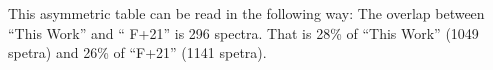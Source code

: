 This asymmetric table can be read in the following way: The overlap between ``This Work'' and `` F+21'' is 296 spectra. That is 28\% of ``This Work'' (1049 spetra) and 26\% of ``F+21'' (1141 spetra).
